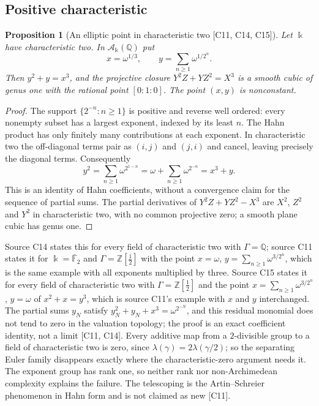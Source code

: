 \documentclass[11pt,oneside]{article}
\numberwithin{equation}{section}
\newtheorem{proposition}[proposition]{Proposition}
\theoremstyle{definition}
\theoremstyle{remark}
\newcommand{\Z}{\mathbb Z}
\newcommand{\Q}{\mathbb Q}
\newcommand{\src}[1]{\textup{\textsf{\small[#1]}}}
\begin{document}
\subsection{Positive characteristic}\label{odg:cr:sub:charp}

\begin{proposition}[An elliptic point in characteristic two \src{C11, C14, C15}]\label{odg:cr:prop:char2}
Let $\Bbbk$ have characteristic two. In $\mathcal A_\Bbbk(\Q)$ put
\[
 x=\omega^{1/3},\qquad y=\sum_{n\ge1}\omega^{1/2^n}.
\]
Then $y^2+y=x^3$, and the projective closure $Y^2Z+YZ^2=X^3$ is a smooth cubic of
genus one with the rational point $[0:1:0]$. The point $(x,y)$ is nonconstant.
\end{proposition}
\begin{proof}
The support $\{2^{-n}:n\ge1\}$ is positive and reverse well ordered:
every nonempty subset has a largest exponent, indexed by its least $n$.
The Hahn product has only finitely many contributions at each exponent.
In characteristic two the off-diagonal terms pair as $(i,j)$ and $(j,i)$
and cancel, leaving precisely the diagonal terms. Consequently
\[
 y^2=\sum_{n\ge1}\omega^{2^{1-n}}
     =\omega+\sum_{n\ge1}\omega^{2^{-n}}=x^3+y.
\]
This is an identity of Hahn coefficients, without a convergence claim
for the sequence of partial sums. The partial
derivatives of $Y^2Z+YZ^2-X^3$ are $X^2$, $Z^2$ and $Y^2$ in characteristic two, with
no common projective zero; a smooth plane cubic has genus one.
\end{proof}

Source C14 states this for every field of characteristic two with $\Gamma=\Q$;
source C11 states it for $\Bbbk=\bar{\mathbb F}_2$ and $\Gamma=\Z[\tfrac12]$ with the
point $x=\omega$, $y=\sum_{n\ge1}\omega^{3/2^n}$, which is the same example with all
exponents multiplied by three. Source C15 states it for every field of characteristic two
with $\Gamma=\Z[\tfrac12]$ and the point $x=\sum_{n\ge1}\omega^{3/2^n}$, $y=\omega$ of
$x^2+x=y^3$, which is source C11's example with $x$ and $y$ interchanged. The partial sums $y_N$ satisfy
$y_N^2+y_N+x^3=\omega^{2^{-N}}$, and this residual monomial does not tend to zero in
the valuation topology; the proof is an exact coefficient identity, not a limit
\src{C11, C14}. Every additive map from a $2$-divisible group to a field of
characteristic two is zero, since $\lambda(\gamma)=2\lambda(\gamma/2)$; so the separating
Euler family disappears exactly where the characteristic-zero argument needs it. The
exponent group has rank one, so neither rank nor non-Archimedean complexity explains
the failure. The telescoping is the Artin--Schreier phenomenon in Hahn form and is not
claimed as new \src{C11}.
\end{document}
